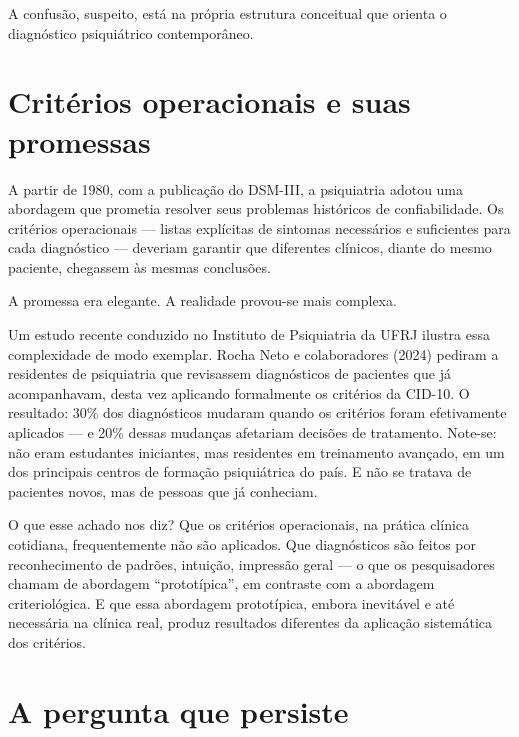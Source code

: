 A confusão, suspeito, está na própria estrutura conceitual que orienta o diagnóstico psiquiátrico contemporâneo.

\section{Critérios operacionais e suas promessas}
\label{sec:criterios-operacionais}

A partir de 1980, com a publicação do DSM-III, a psiquiatria adotou uma abordagem que prometia resolver seus problemas históricos de confiabilidade. Os critérios operacionais --- listas explícitas de sintomas necessários e suficientes para cada diagnóstico --- deveriam garantir que diferentes clínicos, diante do mesmo paciente, chegassem às mesmas conclusões.

A promessa era elegante. A realidade provou-se mais complexa.

Um estudo recente conduzido no Instituto de Psiquiatria da UFRJ ilustra essa complexidade de modo exemplar. Rocha Neto e colaboradores (2024) pediram a residentes de psiquiatria que revisassem diagnósticos de pacientes que já acompanhavam, desta vez aplicando formalmente os critérios da CID-10. O resultado: 30\% dos diagnósticos mudaram quando os critérios foram efetivamente aplicados --- e 20\% dessas mudanças afetariam decisões de tratamento. Note-se: não eram estudantes iniciantes, mas residentes em treinamento avançado, em um dos principais centros de formação psiquiátrica do país. E não se tratava de pacientes novos, mas de pessoas que já conheciam.

O que esse achado nos diz? Que os critérios operacionais, na prática clínica cotidiana, frequentemente não são aplicados. Que diagnósticos são feitos por reconhecimento de padrões, intuição, impressão geral --- o que os pesquisadores chamam de abordagem \enquote{prototípica}, em contraste com a abordagem criteriológica. E que essa abordagem prototípica, embora inevitável e até necessária na clínica real, produz resultados diferentes da aplicação sistemática dos critérios.

\section{A pergunta que persiste}
\label{sec:pergunta-persiste}

